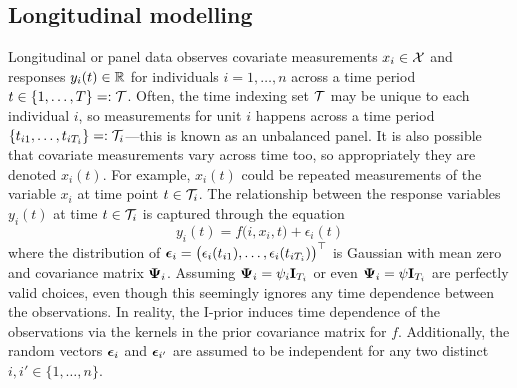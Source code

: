
\subsection{Longitudinal modelling}

Longitudinal or panel data observes covariate measurements $x_i\in{\mathcal X}$ and responses $y_i(t)\in\mathbb{R}$ for individuals $i=1,\dots,n$ across a time period $t \in \{1,\dots,T\} =: {\mathcal T}$. 
Often, the time indexing set ${\mathcal T}$ may be unique to each individual $i$, so measurements for unit $i$ happens across a time period $\{t_{i1},\dots,t_{iT_i} \} =: {\mathcal T}_i$---this is known as an unbalanced panel.
It is also possible that covariate measurements vary across time too, so appropriately they are denoted $x_i(t)$.
For example, $x_i(t)$ could be repeated measurements of the variable $x_i$ at time point $t\in{\mathcal T}_i$.
The relationship between the response variables $y_i(t)$ at time $t\in{\mathcal T}_i$ is captured through the equation
\[
  y_i(t) = f\big(i, x_i, t \big) + \epsilon_{i}(t)
\]
where the distribution of ${\bm\epsilon}_i = \big(\epsilon_i(t_{i1}),\dots,\epsilon_i(t_{iT_i}) \big)^\top$ is Gaussian with mean zero and covariance matrix ${\bm\Psi}_i$.
Assuming ${\bm\Psi}_i=\psi_i{\mathbf I}_{T_i}$ or even ${\bm\Psi}_i=\psi{\mathbf I}_{T_i}$ are perfectly valid choices, even though this seemingly ignores any time dependence between the observations.
In reality, the I-prior induces time dependence of the observations via the kernels in the prior covariance matrix for $f$.
Additionally, the random vectors ${\bm\epsilon}_i$ and ${\bm\epsilon}_{i'}$ are assumed to be independent for any two distinct $i,i'\in\{1,\dots,n\}$.

